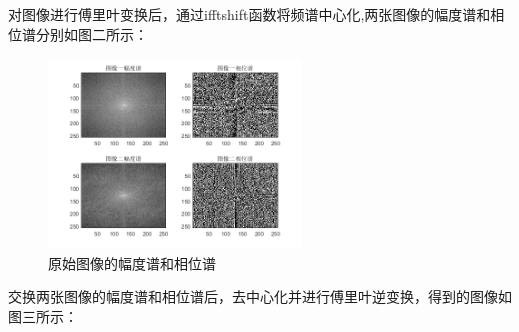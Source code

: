 \documentclass[UTF8]{article}
\begin{document}
\par 对图像进行傅里叶变换后，通过ifftshift函数将频谱中心化,两张图像的幅度谱和相位谱分别如图二所示：
\begin{figure}[htbp]
    \centering
    \includegraphics[width=0.6\textwidth]{../img/A-P.png} %
    \caption{原始图像的幅度谱和相位谱}
    \label{fig:AP}
\end{figure}
\par 交换两张图像的幅度谱和相位谱后，去中心化并进行傅里叶逆变换，得到的图像如图三所示：
\end{document}
